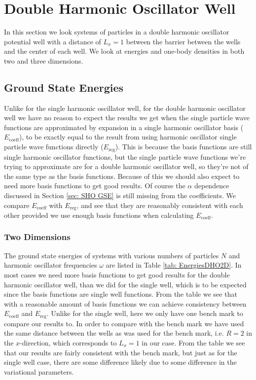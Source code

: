 \documentclass[../main.tex]{subfiles}
\begin{document}
\section{Double Harmonic Oscillator Well}

In this section we look systems of particles in a double harmonic oscillator potential well with a distance of $L_x = 1$ between the barrier between the wells and the center of each well. We look at energies and one-body densities in both two and three dimensions.

\subsection{Ground State Energies}

Unlike for the single harmonic oscillator well, for the double harmonic oscillator well we have no reason to expect the results we get when the single particle wave functions are approximated by expansion in a single harmonic oscillator basis ($E_\textrm{coeff}$), to be exactly equal to the result from using harmonic oscillator single particle wave functions directly ($E_\textrm{reg}$). This is because the basis functions are still single harmonic oscillator functions, but the single particle wave functions we're trying to approximate are for a double harmonic oscillator well, so they're not of the same type as the basis functions. Because of this we should also expect to need more basis functions to get good results. Of course the $\alpha$ dependence discussed in Section \ref{sec: SHO GSE} is still missing from the coefficients. We compare $E_\textrm{coeff}$ with $E_\textrm{reg}$, and see that they are reasonably consistent with each other provided we use enough basis functions when calculating $E_\textrm{coeff}$.

\subsubsection{Two Dimensions}

The ground state energies of systems with various numbers of particles $N$ and harmonic oscillator frequencies $\omega$ are listed in Table \ref{tab: EnergiesDHO2D}. In most cases we need more basis functions to get good results for the double harmonic oscillator well, than we did for the single well, which is to be expected since the basis functions are single well functions. From the table we see that with a reasonable amount of basis functions we can achieve consistency between $E_\textrm{coeff}$ and $E_\textrm{reg}$. Unlike for the single well, here we only have one bench mark to compare our results to. In order to compare with the bench mark we have used the same distance between the wells as was used for the bench mark, i.e. $R=2$ in the $x$-direction, which corresponds to $L_x = 1$ in our case. From the table we see that our results are fairly consistent with the bench mark, but just as for the single well case, there are some difference likely due to some difference in the variational parameters.
\end{document}
